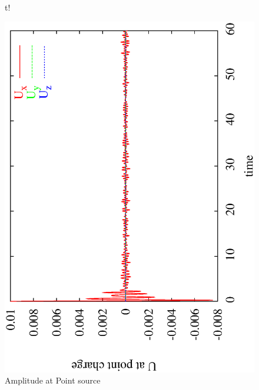 \begin{figure}{t!}
\centerline{\includegraphics[width=3.in,angle=270]{figures/WavePC.eps}}
\caption{Amplitude at Point source}
\label{WAVE FIG 1}
\end{figure}


